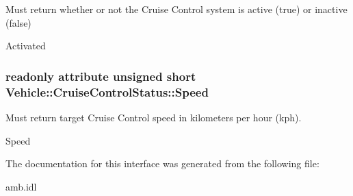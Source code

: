 Must return whether or not the Cruise Control system is active (true) or inactive (false) 

Activated \hypertarget{interfaceVehicle_1_1CruiseControlStatus_aa504d0647f131ca980e8d53431cbb5c6}{
\subsubsection[{Speed}]{\setlength{\rightskip}{0pt plus 5cm}readonly attribute unsigned short Vehicle\-::\-Cruise\-Control\-Status\-::\-Speed}}\label{interfaceVehicle_1_1CruiseControlStatus_aa504d0647f131ca980e8d53431cbb5c6}


Must return target Cruise Control speed in kilometers per hour (kph). 

Speed 

The documentation for this interface was generated from the following file\-:\begin{DoxyCompactItemize}
\item 
amb.\-idl\end{DoxyCompactItemize}
